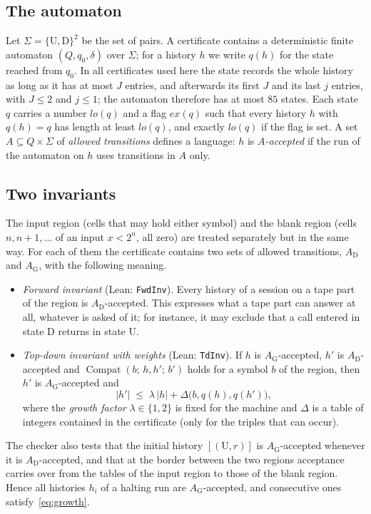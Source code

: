 \documentclass[11pt,a4paper]{amsart}
\theoremstyle{definition}
\theoremstyle{remark}
\newcommand{\U}{\mathrm{U}}
\newcommand{\D}{\mathrm{D}}
\newcommand{\lean}[1]{\texttt{#1}}
\newcommand{\len}[1]{\lvert #1\rvert}
\begin{document}
\subsection{The automaton}
Let $\Sigma=\{\U,\D\}^2$ be the set of pairs. A certificate contains a deterministic finite automaton
$(Q,q_0,\delta)$ over $\Sigma$; for a history $h$ we write $q(h)$ for the state reached from $q_0$. In all
certificates used here the state records the whole history as long as it has at most $J$ entries, and
afterwards its first $J$ and its last $j$ entries, with $J\le2$ and $j\le1$; the automaton therefore has at
most $85$ states. Each state $q$ carries a number $\mathit{lo}(q)$ and a flag $\mathit{ex}(q)$ such that every
history $h$ with $q(h)=q$ has length at least $\mathit{lo}(q)$, and exactly $\mathit{lo}(q)$ if the flag is
set. A set $A\subseteq Q\times\Sigma$ of \emph{allowed transitions} defines a language: $h$ is
\emph{$A$-accepted} if the run of the automaton on $h$ uses transitions in $A$ only.

\subsection{Two invariants}
The input region (cells that may hold either symbol) and the blank region (cells $n,n+1,\dots$ of an input
$x<2^n$, all zero) are treated separately but in the same way. For each of them the certificate contains two
sets of allowed transitions, $A_{\mathrm D}$ and $A_{\mathrm G}$, with the following meaning.

\begin{itemize}[leftmargin=2em]
\item \emph{Forward invariant} (Lean: \lean{FwdInv}). Every history of a session on a tape part of the region
is $A_{\mathrm D}$-accepted. This expresses what a tape part can answer at all, whatever is asked of it; for
instance, it may exclude that a call entered in state $\D$ returns in state $\U$.
\item \emph{Top-down invariant with weights} (Lean: \lean{TdInv}). If $h$ is $A_{\mathrm G}$-accepted, $h'$ is
$A_{\mathrm D}$-accepted and $\operatorname{Compat}(b;\,h,h';\,b')$ holds for a symbol $b$ of the region, then
$h'$ is $A_{\mathrm G}$-accepted and
\begin{equation}\label{eq:growth}
\len{h'}\;\le\; \lambda\,\len{h}+\Delta\bigl(b,q(h),q(h')\bigr),
\end{equation}
where the \emph{growth factor} $\lambda\in\{1,2\}$ is fixed for the machine and $\Delta$ is a table of integers contained in the certificate
(only for the triples that can occur).
\end{itemize}
The checker also tests that the initial history $[(\U,r)]$ is $A_{\mathrm G}$-accepted whenever it is
$A_{\mathrm D}$-accepted, and that at the border between the two regions acceptance carries over from the
tables of the input region to those of the blank region. Hence all histories $h_i$ of a halting run are
$A_{\mathrm G}$-accepted, and consecutive ones satisfy~\eqref{eq:growth}.
\end{document}
